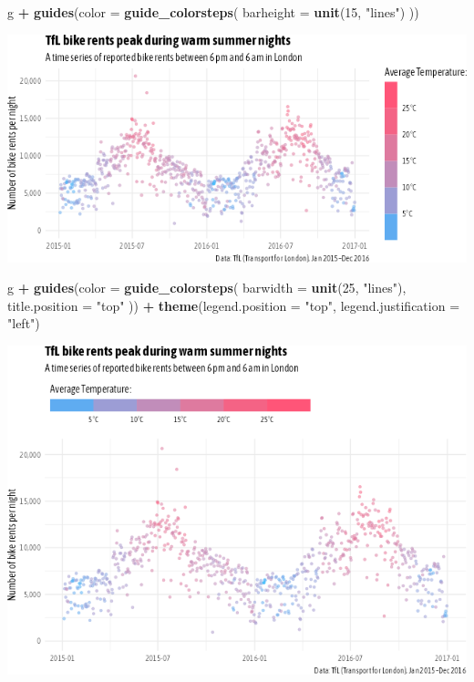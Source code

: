 \documentclass[
]{krantz}
\makeatletter
\newenvironment{Shaded}{\begin{snugshade}}{\end{snugshade}}
\newcommand{\AttributeTok}[1]{\textcolor[rgb]{0.27,0.27,0.27}{#1}}
\newcommand{\DecValTok}[1]{\textcolor[rgb]{0.06,0.06,0.06}{#1}}
\newcommand{\FunctionTok}[1]{\textcolor[rgb]{0.27,0.27,0.27}{\textbf{#1}}}
\newcommand{\NormalTok}[1]{#1}
\newcommand{\SpecialCharTok}[1]{\textcolor[rgb]{0.43,0.43,0.43}{\textbf{#1}}}
\newcommand{\StringTok}[1]{\textcolor[rgb]{0.5,0.5,0.5}{#1}}
\newenvironment{kframe}{%
\medskip{}
\setlength{\fboxsep}{.8em}
 \def\at@end@of@kframe{}%
 \ifinner\ifhmode%
  \def\at@end@of@kframe{\end{minipage}}%
  \begin{minipage}{\columnwidth}%
 \fi\fi%
 \def\FrameCommand##1{\hskip\@totalleftmargin \hskip-\fboxsep
 \colorbox{shadecolor}{##1}\hskip-\fboxsep
     \hskip-\linewidth \hskip-\@totalleftmargin \hskip\columnwidth}%
 \MakeFramed {\advance\hsize-\width
   \@totalleftmargin\z@ \linewidth\hsize
   \@setminipage}}%
 {\par\unskip\endMakeFramed%
 \at@end@of@kframe}
\renewenvironment{Shaded}{\begin{kframe}}{\end{kframe}}
\makeatother
\begin{document}
\begin{Shaded}
\begin{Highlighting}[]
\NormalTok{g }\SpecialCharTok{+} \FunctionTok{guides}\NormalTok{(}\AttributeTok{color =} \FunctionTok{guide\_colorsteps}\NormalTok{(}
    \AttributeTok{barheight =} \FunctionTok{unit}\NormalTok{(}\DecValTok{15}\NormalTok{, }\StringTok{"lines"}\NormalTok{)}
\NormalTok{  ))}
\end{Highlighting}
\end{Shaded}

\includegraphics{bookdown_files/figure-latex/05guideKeyHeight-1.png}

\begin{Shaded}
\begin{Highlighting}[]
\NormalTok{g }\SpecialCharTok{+} \FunctionTok{guides}\NormalTok{(}\AttributeTok{color =} \FunctionTok{guide\_colorsteps}\NormalTok{(}
    \AttributeTok{barwidth =} \FunctionTok{unit}\NormalTok{(}\DecValTok{25}\NormalTok{, }\StringTok{"lines"}\NormalTok{), }\AttributeTok{title.position =} \StringTok{"top"}
\NormalTok{  )) }\SpecialCharTok{+}
  \FunctionTok{theme}\NormalTok{(}\AttributeTok{legend.position =} \StringTok{"top"}\NormalTok{, }\AttributeTok{legend.justification =} \StringTok{"left"}\NormalTok{)}
\end{Highlighting}
\end{Shaded}

\includegraphics{bookdown_files/figure-latex/05guidePositionTop-1.png}
\end{document}

